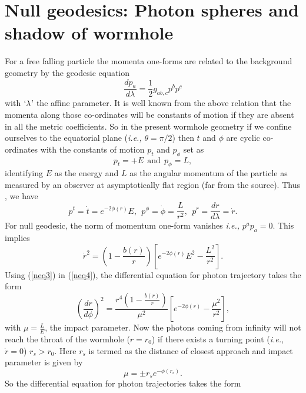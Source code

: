 \documentclass[10pt]{revtex4}
\begin{document}
 \section{Null geodesics: Photon spheres and shadow of wormhole}
\label{sec:V}
 For a free falling particle the momenta one-forms are related to the background geometry by the geodesic equation
\begin{equation}
\frac{dp_a}{d\lambda}=\frac{1}{2}g_{ab, c}p^bp^c
 \end{equation}
 with $`\lambda$' the affine parameter. It is well known from the above relation that the momenta along those co-ordinates will be constants of motion if they are absent in all the metric coefficients. So in the present wormhole geometry if we confine ourselves to the equatorial plane ({\it i.e.,} $\theta=\pi/2$) then $t$ and $\phi$ are cyclic co-ordinates with the constants of motion $p_t$ and $p_\phi$ set as 
 \begin{equation}
 p_t=+E~~ \text{and}~~p_\phi=L,
 \end{equation}
 identifying $E$ as the energy and $L$ as the angular momentum of the particle as measured by an observer at asymptotically flat region (far from the source). Thus , we have \begin{equation}\label{neq3}
 p^t=\dot{t}=e^{-2\phi(r)}E,~~p^\phi=\dot{\phi}=\frac{L}{r^2},~~p^r=\frac{dr}{d\lambda}=\dot{r}.
 \end{equation}
 For null geodesic, the norm of momentum one-form vanishes {\it i.e.,} $p^ap_a=0$. This implies 
 \begin{equation}\label{neq4}
 \dot{r}^2=\left(1-\frac{b(r)}{r}\right)\left[e^{-2\phi(r)}E^2-\frac{L^2}{r^2}\right].
 \end{equation}
 Using (\ref{neq3}) in (\ref{neq4}), the differential equation for photon trajectory takes the form
 \begin{equation}\label{neq5}
 \left(\frac{dr}{d\phi}\right)^2=\frac{r^4\left(1-\frac{b(r)}{r}\right)}{\mu^2}\left[e^{-2\phi(r)}-\frac{\mu^2}{r^2}\right],
 \end{equation} with $\mu=\frac{L}{E}$, the impact parameter.
 Now the photons coming from infinity will not reach the throat of the wormhole ($r=r_0$) if there exists a turning point ({\it i.e., }$\dot{r}=0$) $r_s>r_0$. Here $r_s$ is termed as the distance of closest approach and impact parameter is given by 
 \begin{equation}
 \mu=\pm r_se^{-\phi(r_s)}.
 \end{equation}
 So the differential equation for photon trajectories takes the form
\end{document}
